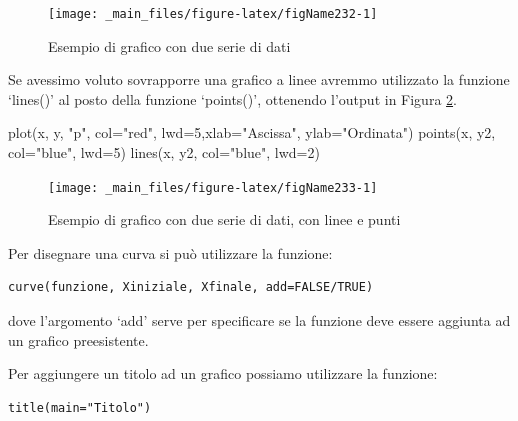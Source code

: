 \documentclass[a4paper,12pt,oneside]{book}
\newenvironment{Shaded}{\begin{snugshade}}{\end{snugshade}}
\newcommand{\DecValTok}[1]{#1}
\newcommand{\StringTok}[1]{#1}
\newcommand{\FunctionTok}[1]{#1}
\newcommand{\AttributeTok}[1]{#1}
\newcommand{\NormalTok}[1]{#1}
\begin{document}
\begin{figure}

{\centering \texttt{[image: \_main\_files/figure-latex/figName232-1]} 

}

\caption{Esempio di grafico con due serie di dati}\label{fig:figName232}
\end{figure}

Se avessimo voluto sovrapporre una grafico a linee avremmo utilizzato la funzione `lines()' al posto della funzione `points()', ottenendo l'output in Figura \ref{fig:figName233}.

\begin{Shaded}
\begin{Highlighting}[]
\FunctionTok{plot}\NormalTok{(x, y, }\StringTok{"p"}\NormalTok{, }\AttributeTok{col=}\StringTok{"red"}\NormalTok{, }\AttributeTok{lwd=}\DecValTok{5}\NormalTok{,}\AttributeTok{xlab=}\StringTok{"Ascissa"}\NormalTok{, }\AttributeTok{ylab=}\StringTok{"Ordinata"}\NormalTok{)}
\FunctionTok{points}\NormalTok{(x, y2, }\AttributeTok{col=}\StringTok{"blue"}\NormalTok{, }\AttributeTok{lwd=}\DecValTok{5}\NormalTok{)}
\FunctionTok{lines}\NormalTok{(x, y2, }\AttributeTok{col=}\StringTok{"blue"}\NormalTok{, }\AttributeTok{lwd=}\DecValTok{2}\NormalTok{)}
\end{Highlighting}
\end{Shaded}

\begin{figure}

{\centering \texttt{[image: \_main\_files/figure-latex/figName233-1]} 

}

\caption{Esempio di grafico con due serie di dati, con linee e punti}\label{fig:figName233}
\end{figure}

Per disegnare una curva si può utilizzare la funzione:

\begin{verbatim}
curve(funzione, Xiniziale, Xfinale, add=FALSE/TRUE)
\end{verbatim}

dove l'argomento `add' serve per specificare se la funzione deve essere aggiunta ad un grafico preesistente.

Per aggiungere un titolo ad un grafico possiamo utilizzare la funzione:

\begin{verbatim}
title(main="Titolo")
\end{verbatim}
\end{document}
